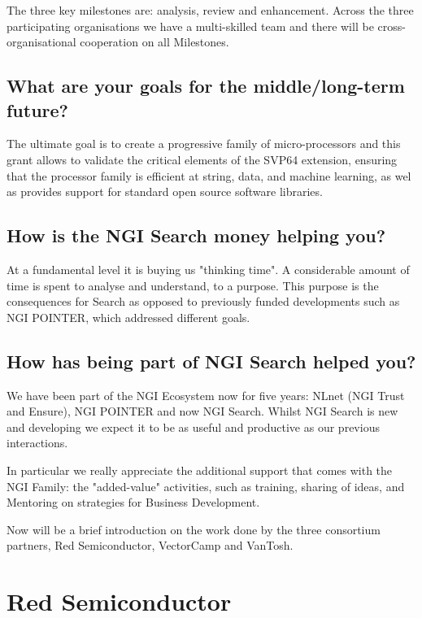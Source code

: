 The three key milestones are: analysis, review and enhancement.
Across the three participating organisations we have a multi-skilled
team and there will be cross-organisational cooperation on all Milestones.

\subsection{What are your goals for the middle/long-term future?}

The ultimate goal is to create a progressive family of micro-processors
and this grant allows to validate the critical elements of the
SVP64 extension, ensuring that the processor family is efficient at string,
data, and machine learning, as wel as provides support for standard open
source software libraries.

\subsection{How is the NGI Search money helping you?}

At a fundamental level it is buying us "thinking time".
A considerable amount of time is spent to analyse and understand,
to a purpose. This purpose is the consequences for Search as
opposed to previously funded developments such as NGI POINTER,
which addressed different goals.

\subsection{How has being part of NGI Search helped you?}

We have been part of the NGI Ecosystem now for five years:
NLnet (NGI Trust and Ensure), NGI POINTER and now NGI Search.
Whilst NGI Search is new and developing we expect it to be as
useful and productive as our previous interactions.

In particular we really appreciate the additional support that
comes with the NGI Family: the "added-value" activities, such
as training, sharing of ideas, and Mentoring on strategies for
Business Development.

Now will be a brief introduction on the work done by the three consortium
partners, Red Semiconductor, VectorCamp and VanTosh.

\section{Red Semiconductor}

